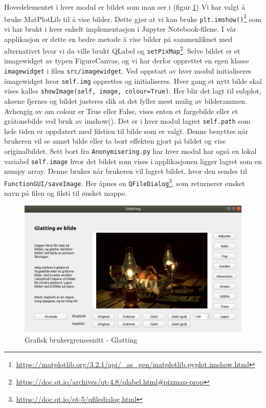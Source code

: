 Hovedelementet i hver modul er bildet som man ser i (figur \ref{fig:guiexample}) Vi har valgt å bruke MatPlotLib til å vise bilder. Dette gjør at vi kan bruke \texttt{plt.imshow()}\footnote{\url{https://matplotlib.org/3.2.1/api/_as_gen/matplotlib.pyplot.imshow.html}} som vi har brukt i hver enkelt implementasjon i Jupyter Notebook-filene. I vår applikasjon er dette en bedre metode å vise bilder på sammenliknet med alternativet hvor vi da ville brukt QLabel og \texttt{setPixMap}\footnote{\url{https://doc.qt.io/archives/qt-4.8/qlabel.html#pixmap-prop}}. Selve bildet er et imagewidget av typen FigureCanvas, og vi har derfor opprettet en egen klasse \texttt {imagewidget} i filen \texttt{src/imagewidget}. Ved oppstart av hver modul initialiseres imagewidget hvor \texttt{self.img} opprettes og initialiseres. Hver gang et nytt bilde skal vises kalles \texttt{showImage(self, image, colour=True)}. Her blir det lagt til subplot, aksene fjernes og bildet justeres slik at det fyller mest mulig av bilderammen. Avhengig av om colour er True eller False, vises enten et fargebilde eller et gråtonebilde ved bruk av imshow(). Det er i hver modul lagret \texttt{self.path} som hele tiden er oppdatert med filstien til bilde som er valgt. Denne benyttes når brukeren vil se annet bilde eller ta bort effekten gjort på bildet og vise originalbildet. Sett bort fra \texttt{Anonymisering.py} har hver modul har også en lokal variabel \texttt{self.image} hvor det bildet som vises i applikasjonen ligger lagret som en numpy array. Denne brukes når brukeren vil lagret bildet, hvor den sendes til \texttt{FunctionGUI/saveImage}. Her åpnes en \texttt{QFileDialog}\footnote{\url{https://doc.qt.io/qt-5/qfiledialog.html}}, som returnerer ønsket navn på filen og filsti til ønsket mappe.

\begin{figure}
\begin{center}
    \includegraphics[width=0.5\columnwidth]{bilder/Gui/guiexample.jpg}
     \caption{Grafisk brukergrensesnitt - Glatting \label{fig:guiexample}}
\end{center}
\end{figure}

